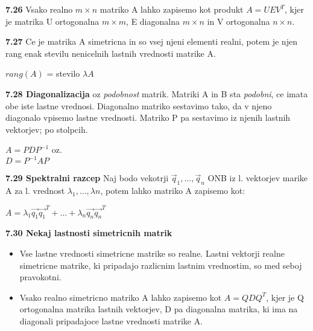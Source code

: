 \documentclass{article}
\begin{document}
\begin{multicols}{4}
	\textbf{7.26} Vsako realno $m \times n$ matriko A lahko zapisemo kot produkt
	$A = UEV^{T}$, kjer je matrika U ortogonalna $m \times m$, E diagonalna $m \times n$ in
	V ortogonalna $n \times n$.

	\textbf{7.27} Ce je  matrika A simetricna in so vsej njeni elementi realni, potem je njen rang enak stevilu nenicelnih lastnih
	vrednosti matrike A.
	\begin{center}
		$rang(A)$ = stevilo $\lambda A$
	\end{center}

	\textbf{7.28 Diagonalizacija} oz \textit{podobnost} matrik. Matriki A in B sta \textit{podobni}, ce imata
	obe iste lastne vrednosi. Diagonalno matriko sestavimo tako, da v njeno diagonalo vpisemo lastne vrednosti. Matriko
	P pa sestavimo iz njenih lastnih vektorjev; po stolpcih.
	\begin{center}
		\begin{math}
			A = PDP^{-1}
		\end{math} oz.\\
		\begin{math}
			D = P^{-1}AP
		\end{math}
	\end{center}

	\textbf{7.29 Spektralni razcep}
	Naj bodo vekotrji $\vec{q}_{1}, \dots, \vec{q}_{n}$ ONB iz l. vektorjev marike A za l. vrednost $\lambda_{1}, \dots, \lambda{n}$,
	potem lahko matriko A zapisemo kot:
	\begin{center}
		\begin{math}
			A = \lambda_{1} \vec{q_{1}} \vec{q_{1}}^{T} + \dots + \lambda_{n} \vec{q_{n}} \vec{q_{n}}^{T}
		\end{math}
	\end{center}

	\textbf{7.30 Nekaj lastnosti simetricnih matrik}
	\begin{itemize}
		\item Vse lastne vrednosti simetricne matrike so realne. Lastni vektorji realne simetricne matrike, ki
		      pripadajo razlicnim lastnim vrednostim, so med seboj pravokotni.
		\item Vsako realno simetricno matriko A lahko zapisemo kot $A = QDQ^{T}$, kjer je Q ortogonalna matrika lastnih vektorjev, D pa diagonalna matrika,
		      ki ima na diagonali pripadajoce lastne vrednosti matrike A.
	\end{itemize}

\end{multicols}
\end{document}
